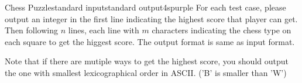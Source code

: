 \begin{problem}{Chess Puzzle}{standard input}{standard output}{4s}{purple}
\OutputFile
For each test case, please output an integer in the first line indicating the highest score that player can get. Then following $n$ lines, each line with $m$ characters indicating the chess type on each square to get the higgest score. The output format is same as input format.

Note that if there are mutiple ways to get the highest score, you should output the one with smallest lexicographical order in ASCII. ('B' is smaller than 'W')

\Example

\begin{example}
%
\end{example}
\end{problem}